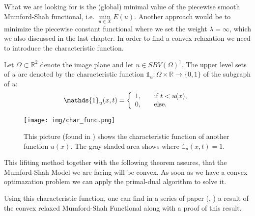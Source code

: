     What we are looking for is the (global) minimal value of the piecewise smooth Mumford-Shah functional, i.e. $\min\limits_{u \in X} E(u)$. Another approach would be to minimize the piecewise constant functional where we set the weight $\lambda = \infty$, which we also discussed in the last chapter. In order to find a convex relaxation we need to introduce the characteristic function.

    \begin{definition}
    \label{def:characteristic_function}
        Let $\Omega \subset \mathbb{R}^{2}$ denote the image plane and let $u \in SBV(\Omega)^{1}$. The upper level sets of $u$ are denoted by the characteristic function $\mathds{1}_{u}: \Omega \times \mathbb{R} \longrightarrow \{ 0, 1 \}$ of the subgraph of $u$:
            \begin{equation}
                \mathds{1}_{u}(x, t) =
                    \left\{
                        \begin{array}{l l}
                            1, & \quad \text{if $t < u(x)$}, \\
                            0, & \quad \text{else}.
                        \end{array}
                    \right.
            \label{eq:characteristic_function}
            \end{equation}
    \end{definition}

    \begin{figure}[ht]
        \centering
        \texttt{[image: img/char\_func.png]}
        \caption{This picture (found in \cite{Pock-et-al-iccv09}) shows the characteristic function of another function $u(x)$. The gray shaded area shows where $\mathds{1}_{u}(x, t) = 1$.}
        \label{fig:characteristic_function}
    \end{figure}

    \begin{remark}
        This lifiting method together with the following theorem assures, that the Mumford-Shah Model we are facing will be convex. As soon as we have a convex optimazation problem we can apply the primal-dual algorithm to solve it.
    \end{remark}

    Using this characteristic function, one can find in a series of paper (\cite{kelvey-sscv}, \cite{Alberti-et-al-cvpde}) a result of the convex relaxed Mumford-Shah Functional along with a proof of this result.

